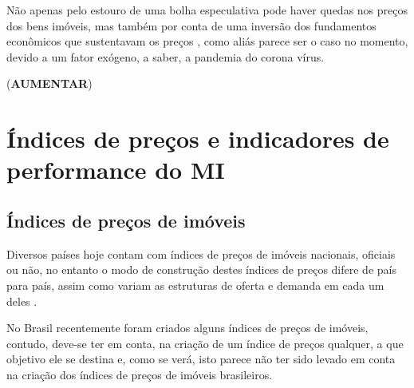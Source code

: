 \documentclass[
	12pt,				%
	oneside,			%
	a4paper,			%
	chapter=TITLE,		%
	section=TITLE,		%
	english,			%
	brazil				%
	]{abntex2}
\begin{document}
Não apenas pelo estouro de uma bolha especulativa pode haver quedas nos preços
dos bens imóveis, mas também por conta de uma inversão dos fundamentos
econômicos que sustentavam os preços \autocite[129]{Case2000}, como aliás parece ser o
caso no momento, devido a um fator exógeno, a saber, a pandemia do corona vírus.

(\textbf{AUMENTAR})

\hypertarget{indices}{%
\chapter{\texorpdfstring{Índices de preços e indicadores de performance do \gls{MI}}{Índices de preços e indicadores de performance do }}\label{indices}}

\hypertarget{uxedndices-de-preuxe7os-de-imuxf3veis}{%
\section{Índices de preços de imóveis}\label{uxedndices-de-preuxe7os-de-imuxf3veis}}

Diversos países hoje contam com índices de preços de imóveis nacionais, oficiais
ou não, no entanto o modo de construção destes índices de preços difere de país
para país, assim como variam as estruturas de oferta e demanda em cada um deles
\autocite[3-4]{regulation}.

No Brasil recentemente foram criados alguns índices de preços de imóveis,
contudo, deve-se ter em conta, na criação de um índice de preços qualquer, a que
objetivo ele se destina e, como se verá, isto parece não ter sido levado em
conta na criação dos índices de preços de imóveis brasileiros.
\end{document}
